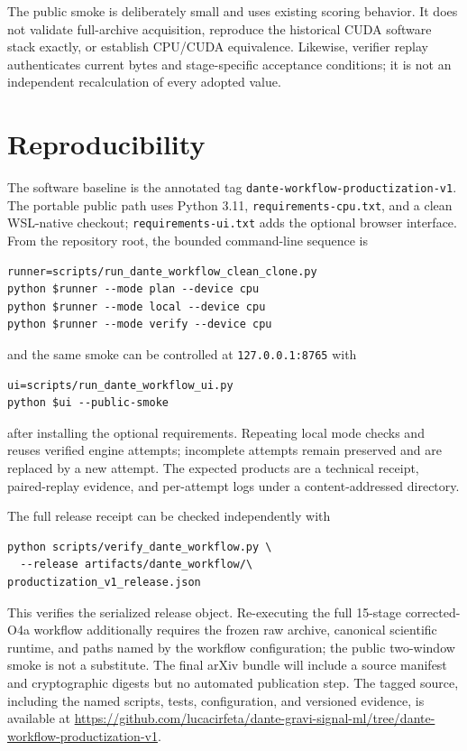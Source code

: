 \documentclass[aps,prd,twocolumn,superscriptaddress,nofootinbib,amsmath,amssymb,floatfix,10pt]{revtex4-2}
\begin{document}
The public smoke is deliberately small and uses existing scoring behavior.  It
does not validate full-archive acquisition, reproduce the historical CUDA
software stack exactly, or establish CPU/CUDA equivalence.  Likewise, verifier
replay authenticates current bytes and stage-specific acceptance conditions;
it is not an independent recalculation of every adopted value.

\section{Reproducibility}
\label{sec:reproducibility}

The software baseline is the annotated tag
\texttt{dante-workflow-productization-v1}.  The portable public path uses
Python 3.11, \texttt{requirements-cpu.txt}, and a clean WSL-native checkout;
\texttt{requirements-ui.txt} adds the optional browser interface.  From the
repository root, the bounded command-line sequence is
{\small
\begin{verbatim}
runner=scripts/run_dante_workflow_clean_clone.py
python $runner --mode plan --device cpu
python $runner --mode local --device cpu
python $runner --mode verify --device cpu
\end{verbatim}
}
and the same smoke can be controlled at \texttt{127.0.0.1:8765} with
{\small
\begin{verbatim}
ui=scripts/run_dante_workflow_ui.py
python $ui --public-smoke
\end{verbatim}
}
after installing the optional requirements.  Repeating local mode checks and
reuses verified engine attempts; incomplete attempts remain preserved and are
replaced by a new attempt.  The expected products are a technical receipt,
paired-replay evidence, and per-attempt logs under a content-addressed
directory.

The full release receipt can be checked independently with
{\small
\begin{verbatim}
python scripts/verify_dante_workflow.py \
  --release artifacts/dante_workflow/\
productization_v1_release.json
\end{verbatim}
}
This verifies the serialized release object.  Re-executing the full 15-stage
corrected-O4a workflow additionally requires the frozen raw archive, canonical
scientific runtime, and paths named by the workflow configuration; the public
two-window smoke is not a substitute.  The final arXiv bundle will include a
source manifest and cryptographic digests but no automated publication step.
The tagged source, including the named scripts, tests, configuration, and
versioned evidence, is available at
\url{https://github.com/lucacirfeta/dante-gravi-signal-ml/tree/dante-workflow-productization-v1}.
\end{document}
